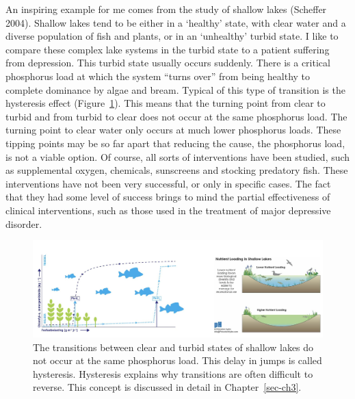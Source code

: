\documentclass[
  a4paper,
  DIV=11,
  numbers=noendperiod,
  oneside]{scrreprt}
\begin{document}
An inspiring example for me comes from the study of shallow lakes
(Scheffer 2004). Shallow lakes tend to be either in a `healthy' state,
with clear water and a diverse population of fish and plants, or in an
`unhealthy' turbid state. I like to compare these complex lake systems
in the turbid state to a patient suffering from depression. This turbid
state usually occurs suddenly. There is a critical phosphorus load at
which the system ``turns over'' from being healthy to complete dominance
by algae and bream. Typical of this type of transition is the hysteresis
effect (Figure~\ref{fig-ch1-img2}). This means that the turning point
from clear to turbid and from turbid to clear does not occur at the same
phosphorus load. The turning point to clear water only occurs at much
lower phosphorus loads. These tipping points may be so far apart that
reducing the cause, the phosphorus load, is not a viable option. Of
course, all sorts of interventions have been studied, such as
supplemental oxygen, chemicals, sunscreens and stocking predatory fish.
These interventions have not been very successful, or only in specific
cases. The fact that they had some level of success brings to mind the
partial effectiveness of clinical interventions, such as those used in
the treatment of major depressive disorder.

\begin{figure}

{\centering \includegraphics{media/ch1/image2.jpg}

}

\caption{\label{fig-ch1-img2}The transitions between clear and turbid
states of shallow lakes do not occur at the same phosphorus load. This
delay in jumps is called hysteresis. Hysteresis explains why transitions
are often difficult to reverse. This concept is discussed in detail in
Chapter~\ref{sec-ch3}.}

\end{figure}
\end{document}
